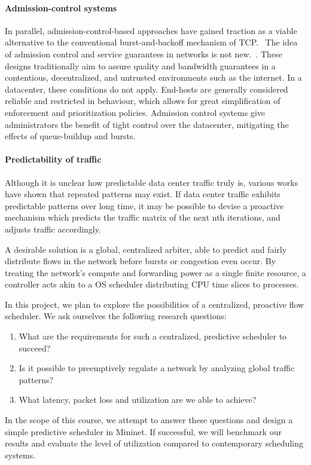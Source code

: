 \paragraph{Admission-control systems}
In parallel, admission-control-based approaches have gained traction as a 
viable alternative to the conventional burst-and-backoff mechanism of 
TCP.~\cite{expresspass, fastpass, perc}
The idea of admission control and service guarantees in networks is not 
new.~\cite{access_limit, access_limit2}. These designs traditionally 
aim to assure quality and bandwidth guarantees in a contentious, decentralized, 
and untrusted environments such as the internet. In a datacenter, these 
conditions do not apply. End-hosts are generally considered reliable and 
restricted in behaviour, which allows for great simplification of enforcement 
and prioritization policies. Admission control systems give administrators the 
benefit of tight control over the datacenter, mitigating the effects of 
queue-buildup and bursts.

\paragraph{Predictability of traffic}
Although it is unclear how predictable data center traffic truly is, various 
works have shown that repeated patterns may 
exist.\cite{msr_dc,fb_dc,traffic,microte}
If data center traffic exhibits predictable patterns over long time, it may be 
possible to devise a proactive mechanism which predicts the traffic matrix of 
the next nth iterations, and adjusts traffic accordingly.


A desirable solution is a global, centralized arbiter, able to predict and 
fairly distribute flows in the network before bursts or congestion even occur. 
By treating the network's compute and forwarding power as a single finite 
resource, a controller acts akin to a OS scheduler distributing CPU time slices 
to processes.

In this project, we plan to explore the possibilities of a centralized, 
proactive flow scheduler. We ask ourselves the following research questions:
\begin{enumerate}
    \item What are the requirements for such a centralized, predictive 
    scheduler to succeed?
    \item Is it possible to preemptively regulate a network by analyzing global 
    traffic patterns?
    \item What latency, packet loss and utilization are we able to achieve?
\end{enumerate}

In the scope of this course, we attempt to answer these questions and design a 
simple predictive scheduler in Mininet. If successful, we will benchmark our 
results and evaluate the level of utilization compared to contemporary 
scheduling systems.